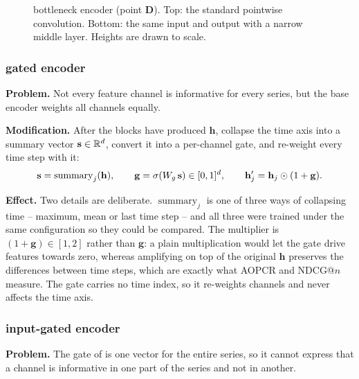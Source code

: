 \begin{figure}[htbp]
  \centering
  
  \caption{\seanet{} bottleneck encoder (point \textbf{D}). Top: the standard pointwise convolution.
  Bottom: the same input and output with a narrow middle layer. Heights are drawn to scale.}
  \label{fig:var_bottleneck}
\end{figure}

\subsubsection{\seanet{} gated encoder}
\label{sec:var:gated}

\textbf{Problem.} Not every feature channel is informative for every series, but the base encoder
weights all channels equally.

\textbf{Modification.} After the blocks have produced $\mathbf{h}$, collapse the time axis into a
summary vector $\mathbf{s} \in \mathbb{R}^{d}$, convert it into a per-channel gate, and re-weight
every time step with it:
\begin{equation}
  \mathbf{s} = \operatorname{summary}_j(\mathbf{h}) ,
  \qquad
  \mathbf{g} = \sigma(W_g\,\mathbf{s}) \in [0,1]^{d} ,
  \qquad
  \mathbf{h}'_j = \mathbf{h}_j \odot (1 + \mathbf{g}) .
  \label{eq:gate}
\end{equation}

\textbf{Effect.} Two details are deliberate. $\operatorname{summary}_j$ is one of three ways of
collapsing time -- maximum, mean or last time step -- and all three were trained under the same
configuration so they could be compared. The multiplier is $(1 + \mathbf{g}) \in [1,2]$ rather than
$\mathbf{g}$: a plain multiplication would let the gate drive features towards zero, whereas
amplifying on top of the original $\mathbf{h}$ preserves the differences between time steps, which
are exactly what AOPCR and NDCG@$n$ measure. The gate carries no time index, so it re-weights
channels and never affects the time axis.

\subsubsection{\seanet{} input-gated encoder}
\label{sec:var:inputgate}

\textbf{Problem.} The gate of  is one vector for the entire series, so it cannot
express that a channel is informative in one part of the series and not in another.

